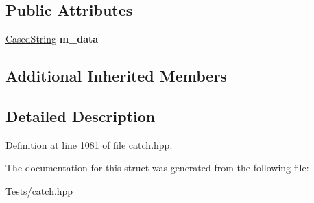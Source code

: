 \subsection*{Public Attributes}
\begin{DoxyCompactItemize}
\item 
\mbox{\label{struct_catch_1_1_matchers_1_1_impl_1_1_std_string_1_1_ends_with_a344d8433f3ba3e0de301ab16ed6dd746}} 
\hyperlink{struct_catch_1_1_matchers_1_1_impl_1_1_std_string_1_1_cased_string}{Cased\+String} {\bfseries m\+\_\+data}
\end{DoxyCompactItemize}
\subsection*{Additional Inherited Members}


\subsection{Detailed Description}


Definition at line 1081 of file catch.\+hpp.



The documentation for this struct was generated from the following file\+:\begin{DoxyCompactItemize}
\item 
Tests/catch.\+hpp\end{DoxyCompactItemize}
